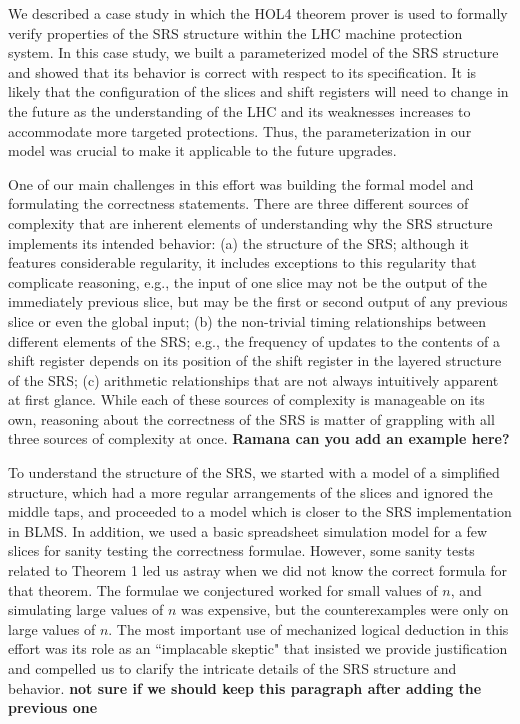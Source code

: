 \documentclass{llncs}
\begin{document}
We described a case study in which the HOL4 theorem prover is used to formally verify properties of the SRS structure within the LHC machine protection system.
In this case study, we built a parameterized model of the SRS structure and showed that its behavior is correct with respect to its specification.
It is likely that the configuration of the slices and shift registers will need to change in the future as the understanding of the LHC and its weaknesses increases to accommodate more targeted protections.
Thus, the parameterization in our model was crucial to make it applicable to the future upgrades.

One of our main challenges in this effort was building the formal model and formulating the correctness statements.
There are three different sources of complexity that are inherent elements of understanding why the SRS structure implements its intended behavior:
(a) the structure of the SRS; although it features considerable regularity, it includes exceptions to this regularity that complicate reasoning, e.g., the input of one slice may not be the output of the immediately previous slice, but may be the first or second output of any previous slice or even the global input;
(b) the non-trivial timing relationships between different elements of the SRS; e.g., the frequency of updates to the contents of a shift register depends on its position of the shift register in the layered structure of the SRS;
(c) arithmetic relationships that are not always intuitively apparent at first glance.
While each of these sources of complexity is manageable on its own, reasoning about the correctness of the SRS is matter of grappling with all three sources of complexity at once. {\bf Ramana can you add an example here?}

To understand the structure of the SRS, we started with a model of a simplified structure, which had a more regular arrangements of the slices and ignored the middle taps, and proceeded to a model which is closer to the SRS implementation in BLMS.
In addition, we used a basic spreadsheet simulation model for a few slices for sanity testing the correctness formulae.
However, some sanity tests related to Theorem 1 led us astray when we did not know the correct formula for that theorem.
The formulae we conjectured worked for small values of $n$, and simulating large values of $n$ was expensive, but the counterexamples were only on large values of $n$.
The most important use of mechanized logical deduction in this effort was its role as an ``implacable skeptic" that insisted we provide justification and compelled us to clarify the intricate details of the SRS structure and behavior. {\bf not sure if we should keep this paragraph after adding the previous one}
\end{document}
